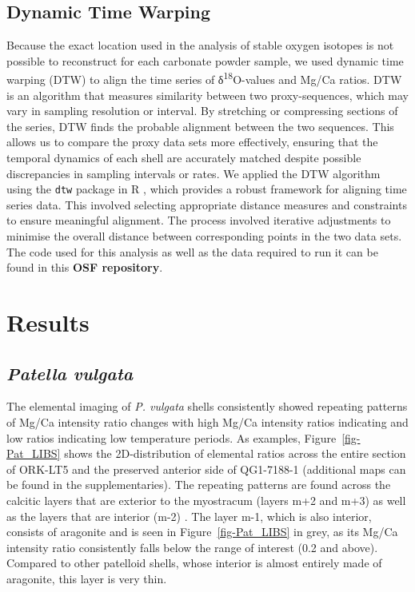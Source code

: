 \documentclass[
  authoryear,
  preprint,
  3p]{elsarticle}
\begin{document}
\subsection{Dynamic Time Warping}\label{dynamic-time-warping}

Because the exact location used in the analysis of stable oxygen
isotopes is not possible to reconstruct for each carbonate powder
sample, we used dynamic time warping (DTW) to align the time series of
δ\textsuperscript{18}O-values and Mg/Ca ratios. DTW is an algorithm that
measures similarity between two proxy-sequences, which may vary in
sampling resolution or interval. By stretching or compressing sections
of the series, DTW finds the probable alignment between the two
sequences. This allows us to compare the proxy data sets more
effectively, ensuring that the temporal dynamics of each shell are
accurately matched despite possible discrepancies in sampling intervals
or rates. We applied the DTW algorithm using the \texttt{dtw} package in
R \citep{Giorgino2009-sj, R_Core_Team2020-mk}, which provides a robust
framework for aligning time series data. This involved selecting
appropriate distance measures and constraints to ensure meaningful
alignment. The process involved iterative adjustments to minimise the
overall distance between corresponding points in the two data sets. The
code used for this analysis as well as the data required to run it can
be found in this \textbf{OSF repository}.

\section{Results}\label{Results}

\subsection{\texorpdfstring{\emph{Patella
vulgata}}{Patella vulgata}}\label{patella-vulgata}

The elemental imaging of \emph{P. vulgata} shells consistently showed
repeating patterns of Mg/Ca intensity ratio changes with high Mg/Ca
intensity ratios indicating and low ratios indicating low temperature
periods. As examples, Figure~\ref{fig-Pat_LIBS} shows the
2D-distribution of elemental ratios across the entire section of ORK-LT5
and the preserved anterior side of QG1-7188-1 (additional maps can be
found in the supplementaries). The repeating patterns are found across
the calcitic layers that are exterior to the myostracum (layers m+2 and
m+3) as well as the layers that are interior (m-2)
\citep{Fenger2007-gf}. The layer m-1, which is also interior, consists
of aragonite and is seen in Figure~\ref{fig-Pat_LIBS} in grey, as its
Mg/Ca intensity ratio consistently falls below the range of interest
(0.2 and above). Compared to other patelloid shells, whose interior is
almost entirely made of aragonite, this layer is very thin.
\end{document}
